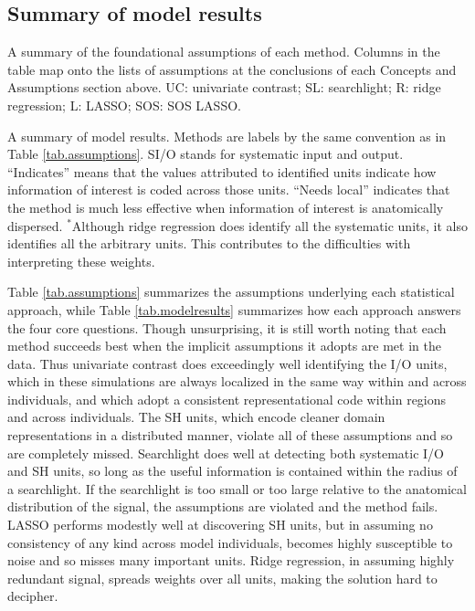 \subsection{Summary of model results}
\begin{table}

\caption{A summary of the foundational assumptions of each method. Columns in the table map onto the lists of assumptions at the conclusions of each Concepts and Assumptions section above. UC: univariate contrast; SL: searchlight; R: ridge regression; L: LASSO; SOS: SOS LASSO.}
\label{tab.assumptions}
\end{table}

\begin{table}

\caption{A summary of model results. Methods are labels by the same convention as in Table \ref{tab.assumptions}. SI/O stands for systematic input and output. ``Indicates'' means that the values attributed to identified units indicate how information of interest is coded across those units. ``Needs local'' indicates that the method is much less effective when information of interest is anatomically dispersed. $^*$Although ridge regression does identify all the systematic units, it also identifies all the arbitrary units. This contributes to the difficulties with interpreting these weights.}
\label{tab.modelresults}
\end{table}

Table \ref{tab.assumptions} summarizes the assumptions underlying each statistical approach, while Table \ref{tab.modelresults} summarizes how each approach answers the four core questions. Though unsurprising, it is still worth noting that each method succeeds best when the implicit assumptions it adopts are met in the data. Thus univariate contrast does exceedingly well identifying the I/O units, which in these simulations are always localized in the same way within and across individuals, and which adopt a consistent representational code within regions and across individuals. The SH units, which encode cleaner domain representations in a distributed manner, violate all of these assumptions and so are completely missed. Searchlight does well at detecting both systematic I/O and SH units, so long as the useful information is contained within the radius of a searchlight. If the searchlight is too small or too large relative to the anatomical distribution of the signal, the assumptions are violated and the method fails. LASSO performs modestly well at discovering SH units, but in assuming no consistency of any kind across model individuals, becomes highly susceptible to noise and so misses many important units. Ridge regression, in assuming highly redundant signal, spreads weights over all units, making the solution hard to decipher.

